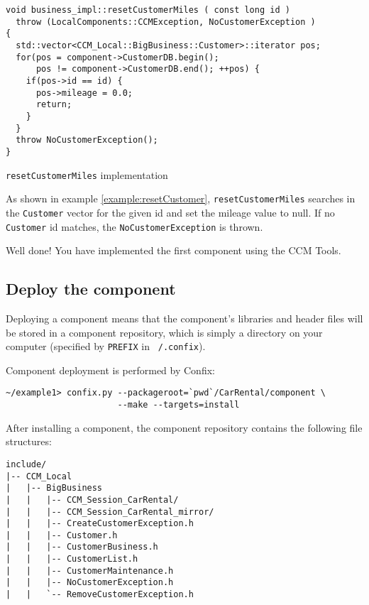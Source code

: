 \begin{Example}
\begin{minifbox}
\begin{small}
\begin{verbatim}
void business_impl::resetCustomerMiles ( const long id )
  throw (LocalComponents::CCMException, NoCustomerException )
{
  std::vector<CCM_Local::BigBusiness::Customer>::iterator pos;
  for(pos = component->CustomerDB.begin(); 
      pos != component->CustomerDB.end(); ++pos) {
    if(pos->id == id) {
      pos->mileage = 0.0;
      return;
    }
  }
  throw NoCustomerException(); 
}
\end{verbatim}
\end{small}
\end{minifbox}
\caption{{\tt resetCustomerMiles} implementation}
\label{example:resetCustomer}
\end{Example}
As shown in example \ref{example:resetCustomer}, {\tt resetCustomerMiles} 
searches in the {\tt Customer}
vector for the given id and set the mileage value to null.
If no {\tt Customer} id matches, the {\tt NoCustomerException} is thrown.

Well done! You have implemented the first component using the CCM Tools.


\newpage
\subsection{Deploy the component}

Deploying a component means that the component's libraries and header files 
will be stored in a component repository, which is simply a directory on your 
computer (specified by {\tt PREFIX} in {\tt ~/.confix}).

Component deployment is performed by Confix:
\begin{small}
\begin{verbatim}
~/example1> confix.py --packageroot=`pwd`/CarRental/component \
                      --make --targets=install
\end{verbatim}
\end{small}

After installing a component, the component repository contains the following
file structures:
\begin{small}
\begin{verbatim}
include/
|-- CCM_Local
|   |-- BigBusiness
|   |   |-- CCM_Session_CarRental/
|   |   |-- CCM_Session_CarRental_mirror/
|   |   |-- CreateCustomerException.h
|   |   |-- Customer.h
|   |   |-- CustomerBusiness.h
|   |   |-- CustomerList.h
|   |   |-- CustomerMaintenance.h
|   |   |-- NoCustomerException.h
|   |   `-- RemoveCustomerException.h
\end{verbatim}
\end{small}

